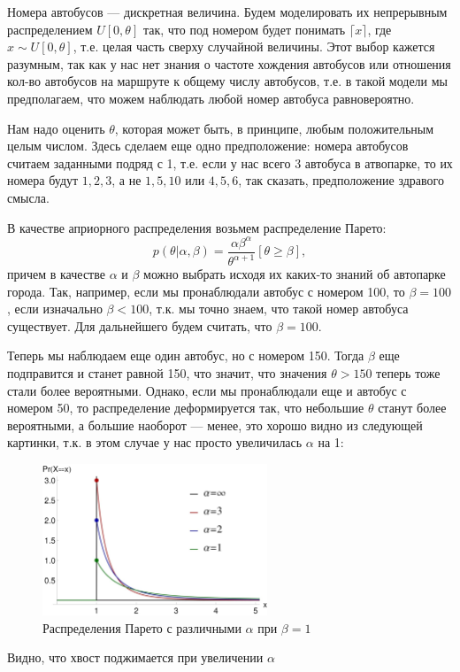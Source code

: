 \begin{solution}
    Номера автобусов --- дискретная величина. Будем моделировать их непрерывным распределением $U[0, \theta]$ так, что под номером будет понимать $\lceil x \rceil$, где $x \sim U[0, \theta]$, т.е. целая часть сверху случайной величины. Этот выбор кажется разумным, так как у нас нет знания о частоте хождения автобусов или отношения кол-во автобусов на маршруте к общему числу автобусов, т.е. в такой модели мы предполагаем, что можем наблюдать любой номер автобуса равновероятно.

    Нам надо оценить $\theta$, которая может быть, в принципе, любым положительным целым числом. Здесь сделаем еще одно предположение: номера автобусов считаем заданными подряд с 1, т.е. если у нас всего 3 автобуса в атвопарке, то их номера будут $1, 2, 3$, а не $1, 5, 10$ или $4, 5, 6$, так сказать, предположение здравого смысла.

    В качестве априорного распределения возьмем распределение Парето:
    \begin{equation}
        p(\theta | \alpha, \beta) = \frac{\alpha \beta^{\alpha}}{\theta^{\alpha + 1}}[\theta \ge \beta],
    \end{equation}
    причем в качестве $\alpha$ и $\beta$ можно выбрать исходя их каких-то знаний об автопарке города.
    Так, например, если мы пронаблюдали автобус с номером 100, то $\beta=100$, если изначально $\beta < 100$, т.к. мы точно знаем, что такой номер автобуса существует. Для дальнейшего будем считать, что $\beta = 100$.

    Теперь мы наблюдаем еще один автобус, но с номером 150. Тогда $\beta$ еще подправится и станет равной 150, что значит, что значения $\theta > 150$ теперь тоже стали более вероятными. Однако, если мы пронаблюдали еще и автобус с номером 50, то распределение деформируется так, что небольшие $\theta$ станут более вероятными, а большие наоборот --- менее, это хорошо видно из следующей картинки, т.к. в этом случае у нас просто увеличилась $\alpha$ на 1:
    \begin{figure}[H]
        \centering
        \includegraphics[width=0.6\textwidth]{pics/pareto.jpg}
        \caption{Распределения Парето с различными $\alpha$ при $\beta = 1$}
    \end{figure}
    Видно, что хвост поджимается при увеличении $\alpha$


\end{solution}
